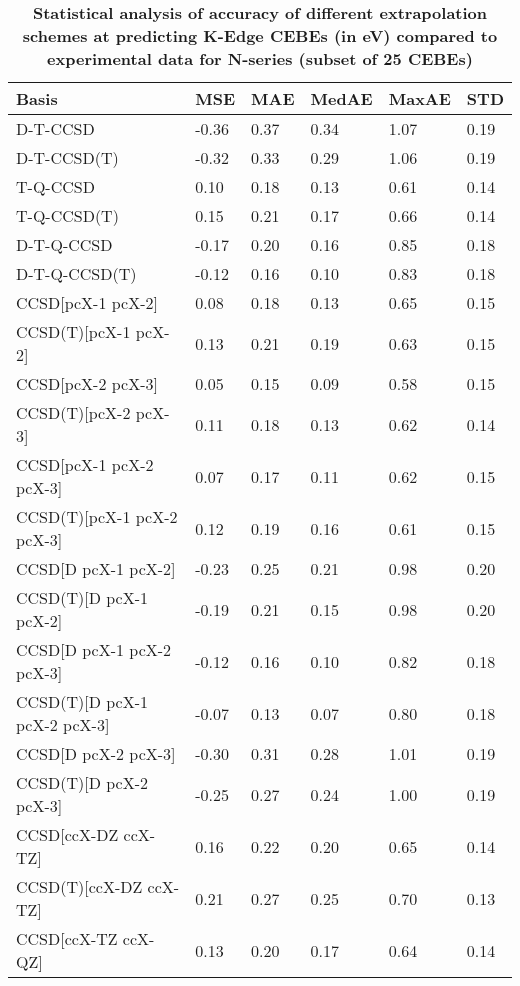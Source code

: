 \begin{table}
  \caption{\textbf{Statistical analysis of accuracy of different extrapolation schemes at predicting K-Edge CEBEs (in eV) compared to experimental data for N-series (subset of 25 CEBEs)}}
  \begin{tabular}{l l l l l l }
    \toprule
    \textbf{Basis} & \textbf{MSE} & \textbf{MAE} & \textbf{MedAE} & \textbf{MaxAE} & \textbf{STD} \\ 
    \midrule
    D-T-CCSD & -0.36 & 0.37 & 0.34 & 1.07 & 0.19 \\ 
    D-T-CCSD(T) & -0.32 & 0.33 & 0.29 & 1.06 & 0.19 \\ 
    T-Q-CCSD & 0.10 & 0.18 & 0.13 & 0.61 & 0.14 \\ 
    T-Q-CCSD(T) & 0.15 & 0.21 & 0.17 & 0.66 & 0.14 \\ 
    D-T-Q-CCSD & -0.17 & 0.20 & 0.16 & 0.85 & 0.18 \\ 
    D-T-Q-CCSD(T) & -0.12 & 0.16 & 0.10 & 0.83 & 0.18 \\ 
    CCSD[pcX-1 pcX-2] & 0.08 & 0.18 & 0.13 & 0.65 & 0.15 \\ 
    CCSD(T)[pcX-1 pcX-2] & 0.13 & 0.21 & 0.19 & 0.63 & 0.15 \\ 
    CCSD[pcX-2 pcX-3] & 0.05 & 0.15 & 0.09 & 0.58 & 0.15 \\ 
    CCSD(T)[pcX-2 pcX-3] & 0.11 & 0.18 & 0.13 & 0.62 & 0.14 \\ 
    CCSD[pcX-1 pcX-2 pcX-3] & 0.07 & 0.17 & 0.11 & 0.62 & 0.15 \\ 
    CCSD(T)[pcX-1 pcX-2 pcX-3] & 0.12 & 0.19 & 0.16 & 0.61 & 0.15 \\ 
    CCSD[D pcX-1 pcX-2] & -0.23 & 0.25 & 0.21 & 0.98 & 0.20 \\ 
    CCSD(T)[D pcX-1 pcX-2] & -0.19 & 0.21 & 0.15 & 0.98 & 0.20 \\ 
    CCSD[D pcX-1 pcX-2 pcX-3] & -0.12 & 0.16 & 0.10 & 0.82 & 0.18 \\ 
    CCSD(T)[D pcX-1 pcX-2 pcX-3] & -0.07 & 0.13 & 0.07 & 0.80 & 0.18 \\ 
    CCSD[D pcX-2 pcX-3] & -0.30 & 0.31 & 0.28 & 1.01 & 0.19 \\ 
    CCSD(T)[D pcX-2 pcX-3] & -0.25 & 0.27 & 0.24 & 1.00 & 0.19 \\ 
    CCSD[ccX-DZ ccX-TZ] & 0.16 & 0.22 & 0.20 & 0.65 & 0.14 \\ 
    CCSD(T)[ccX-DZ ccX-TZ] & 0.21 & 0.27 & 0.25 & 0.70 & 0.13 \\ 
    CCSD[ccX-TZ ccX-QZ] & 0.13 & 0.20 & 0.17 & 0.64 & 0.14 \\ 

\end{tabular}
\end{table}
